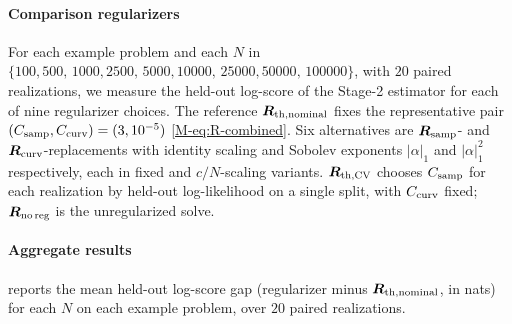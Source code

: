 \documentclass[supplement,review,hidelinks,onefignum,onetabnum]{siamart251216}
\newcommand{\mR}{\bm{R}}
\begin{document}
\paragraph{Comparison regularizers} For each example problem and each $N$ in $\{100, 500,\allowbreak\,1000, 2500,\allowbreak\,5000, 10000,\allowbreak\,25000, 50000,\allowbreak\,100000\}$, with $20$ paired realizations, we measure the held-out log-score of the Stage-2 estimator for each of nine regularizer choices. The reference $\mR_{\rm th,nominal}$ fixes the representative pair $(C_{\rm samp}, C_{\rm curv}) = (3, 10^{-5})$ \eqref{M-eq:R-combined}. Six alternatives are $\mR_{\rm samp}$- and $\mR_{\rm curv}$-replacements with identity scaling and Sobolev exponents $|\alpha|_1$ and $|\alpha|_1^2$ respectively, each in fixed and $c/N$-scaling variants. $\mR_{\rm th,CV}$ chooses $C_{\rm samp}$ for each realization by held-out log-likelihood on a single split, with $C_{\rm curv}$ fixed; $\mR_{\rm no\,reg}$ is the unregularized solve.

\paragraph{Aggregate results}  reports the mean held-out log-score gap (regularizer minus $\mR_{\rm th,nominal}$, in nats) for each $N$ on each example problem, over $20$ paired realizations.
\end{document}
